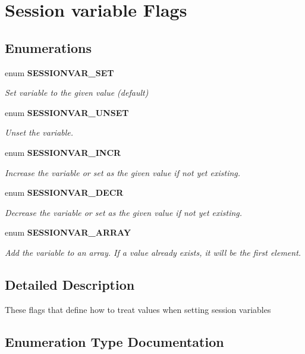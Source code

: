\section{Session variable Flags}
\label{group__SESSION__VariableFlags}
\subsection*{Enumerations}
\begin{DoxyCompactItemize}
\item 
enum {\bf SESSIONVAR\_\-SET} 
\begin{DoxyCompactList}\small\item\em Set variable to the given value (default) \end{DoxyCompactList}\item 
enum {\bf SESSIONVAR\_\-UNSET} 
\begin{DoxyCompactList}\small\item\em Unset the variable. \end{DoxyCompactList}\item 
enum {\bf SESSIONVAR\_\-INCR} 
\begin{DoxyCompactList}\small\item\em Increase the variable or set as the given value if not yet existing. \end{DoxyCompactList}\item 
enum {\bf SESSIONVAR\_\-DECR} 
\begin{DoxyCompactList}\small\item\em Decrease the variable or set as the given value if not yet existing. \end{DoxyCompactList}\item 
enum {\bf SESSIONVAR\_\-ARRAY} 
\begin{DoxyCompactList}\small\item\em Add the variable to an array. If a value already exists, it will be the first element. \end{DoxyCompactList}\end{DoxyCompactItemize}


\subsection{Detailed Description}
These flags that define how to treat values when setting session variables 

\subsection{Enumeration Type Documentation}
